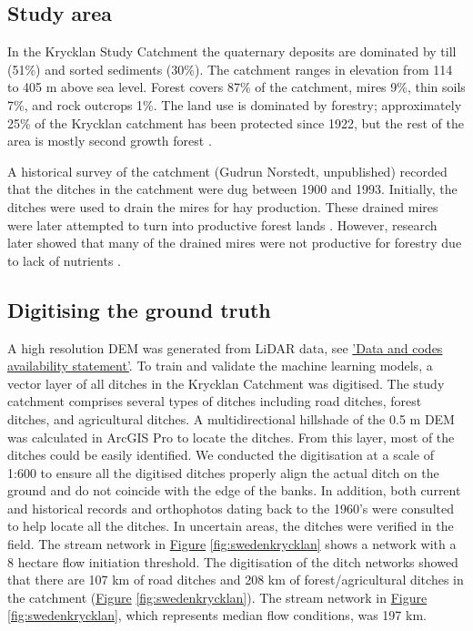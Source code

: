\documentclass[]{interact}
\theoremstyle{plain}%
\theoremstyle{definition}
\theoremstyle{remark}
\begin{document}
\subsection{Study area}
In the Krycklan Study Catchment the quaternary deposits are dominated by till (51\%) and sorted sediments (30\%). The catchment ranges in elevation from 114 to 405 m above sea level. Forest covers 87\% of the catchment, mires 9\%, thin soils 7\%, and rock outcrops 1\%. The land use is dominated by forestry; approximately 25\% of the Krycklan catchment has been protected since 1922, but  the rest of the area is mostly second growth forest \citep{krycklancatchment}. 

A historical survey of the catchment (Gudrun Norstedt, unpublished) recorded  that the ditches in the catchment were dug between 1900 and 1993. Initially, the ditches were used to drain the mires for hay production. These drained mires were later attempted to turn into productive forest lands \citep{paivanen}. However, research later showed that many of the drained mires were not productive for forestry due to lack of nutrients \citep{sikstrom}.

\subsection{Digitising the ground truth}
A high resolution DEM was generated from LiDAR data, see \hyperref[lidartodem]{'Data and codes availability statement'}. To train and validate the machine learning models, a vector layer of all ditches in the Krycklan Catchment \citep{krycklancatchment} was digitised. The study catchment comprises several types of ditches including road ditches, forest ditches, and agricultural ditches. A multidirectional hillshade of the 0.5 m DEM was calculated in ArcGIS Pro to locate the ditches. From this layer, most of the ditches could be easily identified. We conducted the digitisation at a scale of 1:600 to ensure all the digitised ditches properly align the actual ditch on the ground and do not coincide with the edge of the banks. In addition, both current and historical records and orthophotos dating back to the 1960's were consulted to help locate all the ditches. In uncertain areas, the ditches were verified in the field. The stream network in \hyperref[fig:swedenkrycklan]{Figure} \ref{fig:swedenkrycklan} shows a network with a 8 hectare flow initiation threshold. The digitisation of the ditch networks showed that there are 107 km of road ditches and 208 km of forest/agricultural ditches in the catchment (\hyperref[fig:swedenkrycklan]{Figure} \ref{fig:swedenkrycklan}). The stream network in \hyperref[fig:swedenkrycklan]{Figure} \ref{fig:swedenkrycklan}, which represents median flow conditions, was 197 km.
\end{document}

